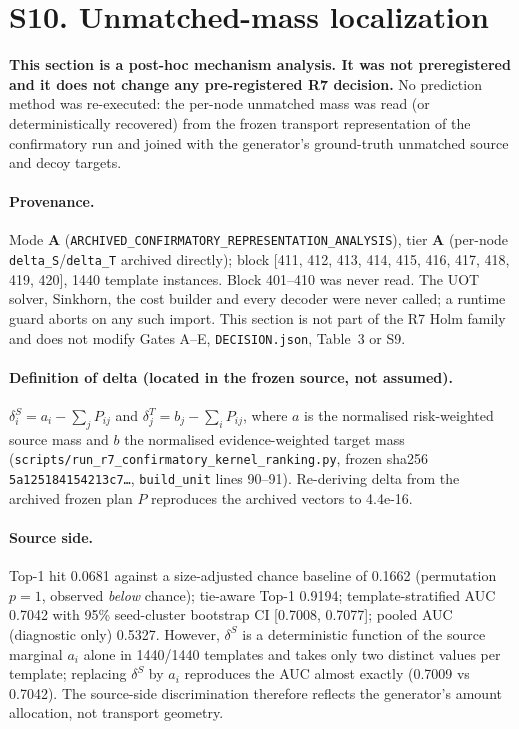 \section*{S10. Unmatched-mass localization}
\textbf{This section is a post-hoc mechanism analysis. It was not preregistered and it
does not change any pre-registered R7 decision.} No prediction method was re-executed: the
per-node unmatched mass was read (or deterministically recovered) from the frozen transport
representation of the confirmatory run and joined with the generator's ground-truth
unmatched source and decoy targets.

\paragraph{Provenance.} Mode \textbf{A} (\texttt{ARCHIVED\_CONFIRMATORY\_REPRESENTATION\_ANALYSIS}),
tier \textbf{A} (per-node \texttt{delta\_S}/\texttt{delta\_T} archived directly);
block [411, 412, 413, 414, 415, 416, 417, 418, 419, 420], 1440 template instances.
Block 401--410 was never read. The UOT solver, Sinkhorn, the cost builder and every decoder
were never called; a runtime guard aborts on any such import. This section is not part of
the R7 Holm family and does not modify Gates A--E, \texttt{DECISION.json}, Table~3 or S9.

\paragraph{Definition of delta (located in the frozen source, not assumed).}
$\delta^S_i = a_i - \sum_j P_{ij}$ and $\delta^T_j = b_j - \sum_i P_{ij}$, where $a$ is
the normalised risk-weighted source mass and $b$ the normalised evidence-weighted target
mass (\texttt{scripts/run\_r7\_confirmatory\_kernel\_ranking.py}, frozen sha256
\texttt{5a125184154213c7\ldots}, \texttt{build\_unit} lines 90--91). Re-deriving delta
from the archived frozen plan $P$ reproduces the archived vectors to
4.4e-16.

\paragraph{Source side.} Top-1 hit 0.0681 against a size-adjusted chance
baseline of 0.1662 (permutation $p = 1$, observed
\emph{below} chance); tie-aware Top-1 0.9194; template-stratified AUC
0.7042 with 95\% seed-cluster bootstrap CI
[0.7008, 0.7077];
pooled AUC (diagnostic only) 0.5327.
However, $\delta^S$ is a deterministic function of the source marginal $a_i$ alone in
1440/1440 templates and takes only two distinct values per
template; replacing $\delta^S$ by $a_i$ reproduces the AUC almost exactly
(0.7009 vs
0.7042). The source-side discrimination therefore reflects the
generator's amount allocation, not transport geometry.

